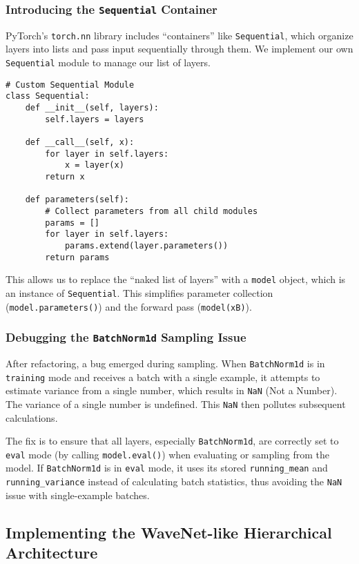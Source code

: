 \subsubsection{Introducing the \texttt{Sequential} Container}
PyTorch's \texttt{torch.nn} library includes ``containers'' like \texttt{Sequential}, which organize layers into lists and pass input sequentially through them. We implement our own \texttt{Sequential} module to manage our list of layers.

\begin{lstlisting}[caption={Custom Sequential Module}]
# Custom Sequential Module
class Sequential:
    def __init__(self, layers):
        self.layers = layers

    def __call__(self, x):
        for layer in self.layers:
            x = layer(x)
        return x

    def parameters(self):
        # Collect parameters from all child modules
        params = []
        for layer in self.layers:
            params.extend(layer.parameters())
        return params
\end{lstlisting}

This allows us to replace the ``naked list of layers'' with a \texttt{model} object, which is an instance of \texttt{Sequential}. This simplifies parameter collection (\texttt{model.parameters()}) and the forward pass (\texttt{model(xB)}).

\subsubsection{Debugging the \texttt{BatchNorm1d} Sampling Issue}
After refactoring, a bug emerged during sampling. When \texttt{BatchNorm1d} is in \texttt{training} mode and receives a batch with a single example, it attempts to estimate variance from a single number, which results in \texttt{NaN} (Not a Number). The variance of a single number is undefined. This \texttt{NaN} then pollutes subsequent calculations.

The fix is to ensure that all layers, especially \texttt{BatchNorm1d}, are correctly set to \texttt{eval} mode (by calling \texttt{model.eval()}) when evaluating or sampling from the model. If \texttt{BatchNorm1d} is in \texttt{eval} mode, it uses its stored \texttt{running\_mean} and \texttt{running\_variance} instead of calculating batch statistics, thus avoiding the \texttt{NaN} issue with single-example batches.

\subsection{Implementing the WaveNet-like Hierarchical Architecture}

